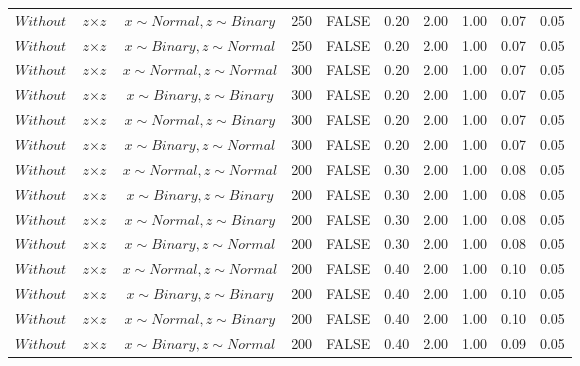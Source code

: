 \begin{longtable}{lccccccccc}
  $Without$ & $\textit{z} \times \textit{z}$ & $\textit{x} \sim Normal, \textit{z} \sim Binary$ & 250 & FALSE & 0.20 & 2.00 & 1.00 & 0.07 & 0.05 \\ 
  $Without$ & $\textit{z} \times \textit{z}$ & $\textit{x} \sim Binary, \textit{z} \sim Normal$ & 250 & FALSE & 0.20 & 2.00 & 1.00 & 0.07 & 0.05 \\ 
  $Without$ & $\textit{z} \times \textit{z}$ & $\textit{x} \sim Normal , \textit{z} \sim Normal$ & 300 & FALSE & 0.20 & 2.00 & 1.00 & 0.07 & 0.05 \\ 
  $Without$ & $\textit{z} \times \textit{z}$ & $\textit{x} \sim Binary, \textit{z} \sim Binary$ & 300 & FALSE & 0.20 & 2.00 & 1.00 & 0.07 & 0.05 \\ 
  $Without$ & $\textit{z} \times \textit{z}$ & $\textit{x} \sim Normal, \textit{z} \sim Binary$ & 300 & FALSE & 0.20 & 2.00 & 1.00 & 0.07 & 0.05 \\ 
  $Without$ & $\textit{z} \times \textit{z}$ & $\textit{x} \sim Binary, \textit{z} \sim Normal$ & 300 & FALSE & 0.20 & 2.00 & 1.00 & 0.07 & 0.05 \\ 
  $Without$ & $\textit{z} \times \textit{z}$ & $\textit{x} \sim Normal , \textit{z} \sim Normal$ & 200 & FALSE & 0.30 & 2.00 & 1.00 & 0.08 & 0.05 \\ 
  $Without$ & $\textit{z} \times \textit{z}$ & $\textit{x} \sim Binary, \textit{z} \sim Binary$ & 200 & FALSE & 0.30 & 2.00 & 1.00 & 0.08 & 0.05 \\ 
  $Without$ & $\textit{z} \times \textit{z}$ & $\textit{x} \sim Normal, \textit{z} \sim Binary$ & 200 & FALSE & 0.30 & 2.00 & 1.00 & 0.08 & 0.05 \\ 
  $Without$ & $\textit{z} \times \textit{z}$ & $\textit{x} \sim Binary, \textit{z} \sim Normal$ & 200 & FALSE & 0.30 & 2.00 & 1.00 & 0.08 & 0.05 \\ 
  $Without$ & $\textit{z} \times \textit{z}$ & $\textit{x} \sim Normal , \textit{z} \sim Normal$ & 200 & FALSE & 0.40 & 2.00 & 1.00 & 0.10 & 0.05 \\ 
  $Without$ & $\textit{z} \times \textit{z}$ & $\textit{x} \sim Binary, \textit{z} \sim Binary$ & 200 & FALSE & 0.40 & 2.00 & 1.00 & 0.10 & 0.05 \\ 
  $Without$ & $\textit{z} \times \textit{z}$ & $\textit{x} \sim Normal, \textit{z} \sim Binary$ & 200 & FALSE & 0.40 & 2.00 & 1.00 & 0.10 & 0.05 \\ 
  $Without$ & $\textit{z} \times \textit{z}$ & $\textit{x} \sim Binary, \textit{z} \sim Normal$ & 200 & FALSE & 0.40 & 2.00 & 1.00 & 0.09 & 0.05 \\ 

\end{longtable}
